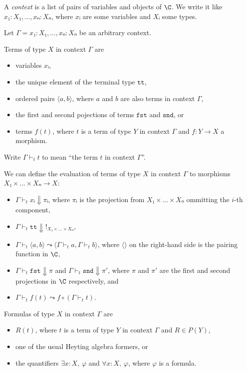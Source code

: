 A \emph{context} is a list of pairs of variables and objects of \(\C\).
We write it like \(x₁ : X₁,… , xₙ : Xₙ\), where \(xᵢ\) are some variables and \(Xᵢ\) some types.

Let \(Γ = x₁ : X₁,… , xₙ : Xₙ\) be an arbitrary context.

Terms of type \(X\) in context \(Γ\) are
\begin{itemize}
    \item variables \(xᵢ\),
    \item the unique element of the terminal type \(\texttt{tt}\),
    \item ordered pairs \(⟨a, b⟩\), where \(a\) and \(b\) are also terms in context \(Γ\),
    \item the first and second pojections of terms \(\texttt{fst}\) and \(\texttt{snd}\), or
    \item terms \(f(t)\), where \(t\) is a term of type \(Y\) in context \(Γ\) and \(f : Y → X\) a morphism.
\end{itemize}

Write \(Γ ⊢_t t\) to mean ``the term \(t\) in context \(Γ\)''.

We can define the evaluation of terms of type \(X\) in context \(Γ\) to morphisms \(X₁×\dots× Xₙ → X\):
\begin{itemize}
    \item \(Γ ⊢_t xᵢ \Downarrow πᵢ\), where \(πᵢ\) is the projection from \(X₁×\dots× Xₙ\) ommitting the \(i\)-th component,
    \item \(Γ ⊢_t \texttt{tt} \Downarrow !_{X₁×\dots× Xₙ}\),
    \item \(Γ ⊢_t ⟨a, b⟩ \leadsto ⟨Γ ⊢_t a, Γ ⊢_t b⟩\), where \(⟨⟩\) on the right-hand side is the pairing function in \(\C\),
    \item \(Γ ⊢_t \texttt{fst} \Downarrow π\) and \(Γ ⊢_t \texttt{snd} \Downarrow π'\), where \(π\) and \(π'\) are the first and second projections in \(\C\) respectively, and
    \item \(Γ ⊢_t f(t) \leadsto f∘(Γ ⊢_t t)\).
\end{itemize}

Formulas of type \(X\) in context \(Γ\) are
\begin{itemize}
    \item \(R(t)\), where \(t\) is a term of type \(Y\) in context \(Γ\) and \(R ∈ P(Y)\),
    \item one of the usual Heyting algebra formers, or
    \item the quantifiers \(∃ x : X,\ φ\) and \(∀ x : X,\ φ\), where \(φ\) is a formula.
\end{itemize}

